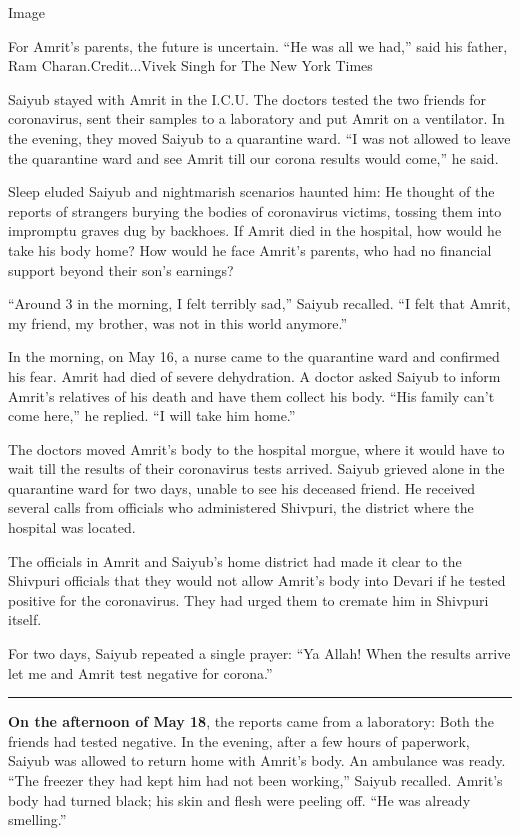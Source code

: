 Image

For Amrit's parents, the future is uncertain. ``He was all we had,''
said his father, Ram Charan.Credit...Vivek Singh for The New York Times

Saiyub stayed with Amrit in the I.C.U. The doctors tested the two
friends for coronavirus, sent their samples to a laboratory and put
Amrit on a ventilator. In the evening, they moved Saiyub to a quarantine
ward. ``I was not allowed to leave the quarantine ward and see Amrit
till our corona results would come,'' he said.

Sleep eluded Saiyub and nightmarish scenarios haunted him: He thought of
the reports of strangers burying the bodies of coronavirus victims,
tossing them into impromptu graves dug by backhoes. If Amrit died in the
hospital, how would he take his body home? How would he face Amrit's
parents, who had no financial support beyond their son's earnings?

``Around 3 in the morning, I felt terribly sad,'' Saiyub recalled. ``I
felt that Amrit, my friend, my brother, was not in this world anymore.''

In the morning, on May 16, a nurse came to the quarantine ward and
confirmed his fear. Amrit had died of severe dehydration. A doctor asked
Saiyub to inform Amrit's relatives of his death and have them collect
his body. ``His family can't come here,'' he replied. ``I will take him
home.''

The doctors moved Amrit's body to the hospital morgue, where it would
have to wait till the results of their coronavirus tests arrived. Saiyub
grieved alone in the quarantine ward for two days, unable to see his
deceased friend. He received several calls from officials who
administered Shivpuri, the district where the hospital was located.

The officials in Amrit and Saiyub's home district had made it clear to
the Shivpuri officials that they would not allow Amrit's body into
Devari if he tested positive for the coronavirus. They had urged them to
cremate him in Shivpuri itself.

For two days, Saiyub repeated a single prayer: ``Ya Allah! When the
results arrive let me and Amrit test negative for corona.''

\begin{center}\rule{0.5\linewidth}{\linethickness}\end{center}

\textbf{On the afternoon of May 18}, the reports came from a laboratory:
Both the friends had tested negative. In the evening, after a few hours
of paperwork, Saiyub was allowed to return home with Amrit's body. An
ambulance was ready. ``The freezer they had kept him had not been
working,'' Saiyub recalled. Amrit's body had turned black; his skin and
flesh were peeling off. ``He was already smelling.''

